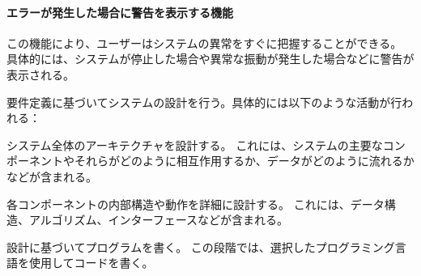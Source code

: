 \paragraph*{エラーが発生した場合に警告を表示する機能}
この機能により、ユーザーはシステムの異常をすぐに把握することができる。
具体的には、システムが停止した場合や異常な振動が発生した場合などに警告が表示される。










要件定義に基づいてシステムの設計を行う。具体的には以下のような活動が行われる：



システム全体のアーキテクチャを設計する。
これには、システムの主要なコンポーネントやそれらがどのように相互作用するか、データがどのように流れるかなどが含まれる。



各コンポーネントの内部構造や動作を詳細に設計する。
これには、データ構造、アルゴリズム、インターフェースなどが含まれる。




設計に基づいてプログラムを書く。
この段階では、選択したプログラミング言語を使用してコードを書く。




